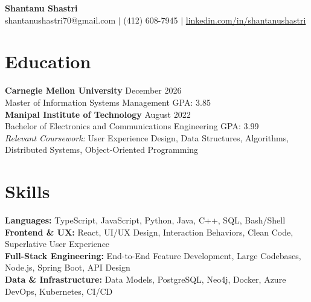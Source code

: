\documentclass[11pt,a4paper]{article}
\begin{document}
\begin{center}
    \Huge \textbf{Shantanu Shastri} \\
    \vspace{2pt}
    \small shantanushastri70@gmail.com $|$ (412) 608-7945 $|$ \href{https://linkedin.com/in/shantanushastri}{linkedin.com/in/shantanushastri}
\end{center}

\vspace{-5pt}
\section{Education}
\noindent
\textbf{Carnegie Mellon University} \hfill December 2026 \\
Master of Information Systems Management \hfill GPA: 3.85 \\
\textbf{Manipal Institute of Technology} \hfill August 2022 \\
Bachelor of Electronics and Communications Engineering \hfill GPA: 3.99 \\
\textit{Relevant Coursework:} User Experience Design, Data Structures, Algorithms, Distributed Systems, Object-Oriented Programming

\vspace{-5pt}
\section{Skills}
\noindent
\textbf{Languages:} TypeScript, JavaScript, Python, Java, C++, SQL, Bash/Shell \\
\textbf{Frontend \& UX:} React, UI/UX Design, Interaction Behaviors, Clean Code, Superlative User Experience \\
\textbf{Full-Stack Engineering:} End-to-End Feature Development, Large Codebases, Node.js, Spring Boot, API Design \\
\textbf{Data \& Infrastructure:} Data Models, PostgreSQL, Neo4j, Docker, Azure DevOps, Kubernetes, CI/CD

\vspace{-5pt}
\end{document}

